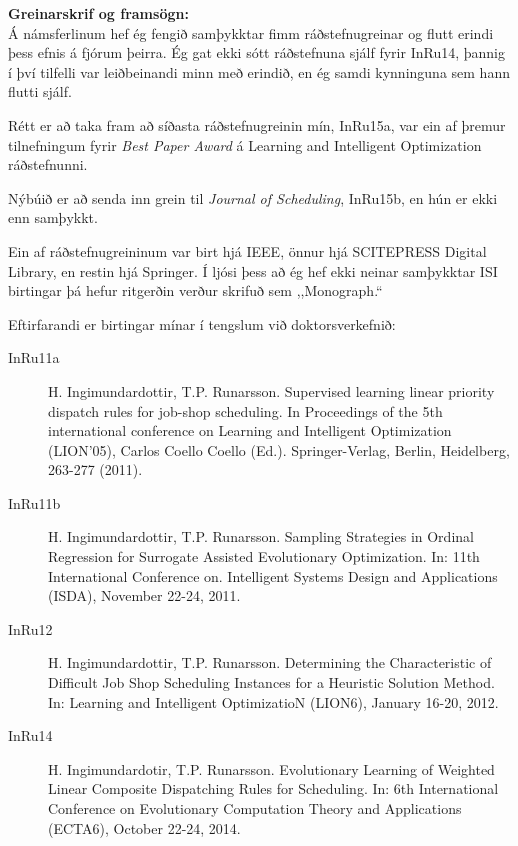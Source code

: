 \documentclass{cover}
\newcommand{\mycaption}[1]{{\bfseries #1:}\\}
\begin{document}
{\mycaption{Greinarskrif og framsögn}
Á námsferlinum hef ég fengið samþykktar fimm ráðstefnugreinar og flutt erindi 
þess efnis á fjórum þeirra. Ég gat ekki sótt ráðstefnuna sjálf fyrir InRu14, 
þannig í því tilfelli var leiðbeinandi minn með erindið, en ég samdi kynninguna 
sem hann flutti sjálf.

Rétt er að taka fram að síðasta ráðstefnugreinin mín, InRu15a, var ein af 
þremur tilnefningum fyrir \emph{Best Paper Award} á Learning and Intelligent 
Optimization ráðstefnunni. 

Nýbúið er að senda inn grein til \emph{Journal of Scheduling}, InRu15b, 
en hún er ekki enn samþykkt. 

Ein af ráðstefnugreininum var birt hjá IEEE, önnur hjá SCITEPRESS Digital 
Library, en restin hjá Springer. 
Í ljósi þess að ég hef ekki neinar samþykktar ISI birtingar þá hefur ritgerðin 
verður skrifuð sem ,,Monograph.``

Eftirfarandi er birtingar mínar í tengslum við doktorsverkefnið:
\begin{description}
    \item[InRu11a] H. Ingimundardottir, T.P. Runarsson. Supervised learning 
    linear priority dispatch rules for job-shop scheduling. In Proceedings of 
    the 5th international conference on Learning and Intelligent Optimization 
    (LION'05), Carlos Coello Coello (Ed.). Springer-Verlag, Berlin, Heidelberg, 
    263-277 (2011). %

    \item[InRu11b] H. Ingimundardottir, T.P. Runarsson. Sampling Strategies in 
    Ordinal Regression for Surrogate Assisted Evolutionary Optimization. In: 
    11th International Conference on. Intelligent Systems Design and 
    Applications (ISDA), November 22-24, 2011. %

    \item[InRu12] H. Ingimundardottir, T.P. Runarsson. Determining the 
    Characteristic of Difficult Job Shop Scheduling Instances for a Heuristic 
    Solution Method. In: Learning and Intelligent OptimizatioN (LION6), January 
    16-20, 2012. %
       
    \item[InRu14] H. Ingimundardotir, T.P. Runarsson. Evolutionary Learning of 
    Weighted Linear Composite Dispatching Rules for Scheduling. In: 6th 
    International Conference on Evolutionary Computation Theory and 
    Applications (ECTA6), October 22-24, 2014. %
    

\end{description}}
\end{document}
